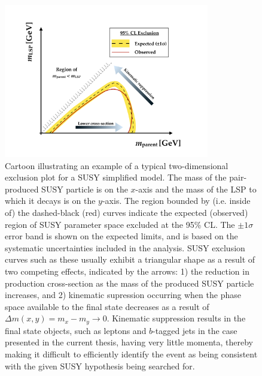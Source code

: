 \begin{figure}[!htb]
    \begin{center}
        \includegraphics[width=0.8\textwidth]{figures/search_stop2l/susy_exclusion_cartoonPDF}
        \caption{
            Cartoon illustrating an example of a typical two-dimensional exclusion plot
            for a SUSY simplified model.
            The mass of the pair-produced SUSY particle is on the $x$-axis and the mass of the
            LSP to which it decays is on the $y$-axis.
            The region bounded by (i.e. inside of) the dashed-black (red) curves indicate
            the expected (observed) region of SUSY parameter space excluded at the 95\% CL.
            The $\pm 1\sigma$ error band is shown on the expected limits, and is based on the
            systematic uncertainties included in the analysis.
            SUSY exclusion curves such as these usually exhibit a triangular shape as a result
            of two competing effects, indicated by the arrows: 1) the reduction in production
            cross-section as the mass of the produced SUSY particle increases, and 2) kinematic
            supression occurring when the phase space available to the final state decreases
            as a result of $\Delta m (x, y) = m_x - m_y \rightarrow 0$.
            Kinematic suppression results in the final state objects, such as leptons and $b$-tagged jets
            in the case presented in the current thesis,
            having very little momenta, thereby making it difficult to efficiently identify
            the event as being consistent with the given SUSY hypothesis being searched for.
        }
        \label{fig:susy_exclusion_cartoon}
    \end{center}
\end{figure}

